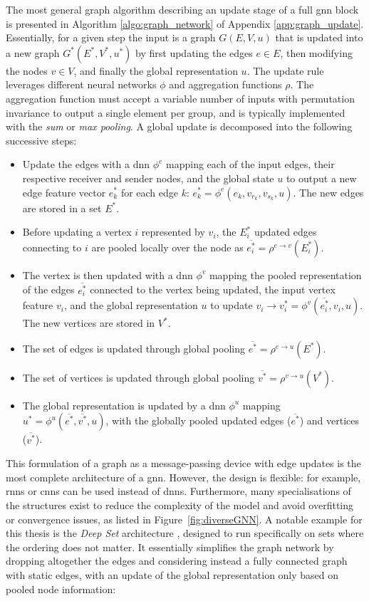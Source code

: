 The most general graph algorithm describing an update stage of a full \gls{gnn} block is presented in Algorithm \ref{algo:graph_network} of Appendix \ref{app:graph_update}. Essentially, for a given step the input is a graph $G(E, V, u)$ that is updated into a new graph $G^*(E^*, V^*, u^*)$ by first updating the edges $e \in E$, then modifying the nodes $v \in V$, and finally the global representation $u$. The update rule leverages different neural networks $\phi$ and aggregation functions $\rho$. The aggregation function must accept a variable number of inputs with permutation invariance to output a single element per group, and is typically implemented with the \textit{sum} or \textit{max pooling}. A global update is decomposed into the following successive steps: 
\begin{itemize}
    \item Update the edges with a \gls{dnn} $\phi^e$ mapping each of the input edges, their respective receiver and sender nodes, and the global state $u$ to output a new edge feature vector $e^*_k$ for each edge $k$: $e^*_k = \phi^e(e_k, v_{r_k}, v_{s_k}, u)$. The new edges are stored in a set $E^*$. 
    \item Before updating a vertex $i$ represented by $v_i$, the $E_i^*$ updated edges connecting to $i$ are pooled locally over the node as $\overline{e^*_i} = \rho^{e \rightarrow v}(E_i^*)$.
    \item The vertex is then updated with a \gls{dnn} $\phi^v$ mapping the pooled representation of the edges $\overline{e^*_i}$ connected to the vertex being updated, the input vertex feature $v_i$, and the global representation $u$ to update $v_i \rightarrow v^*_i = \phi^v(\overline{e^*_i}, v_i, u)$. The new vertices are stored in $V^*$.
    \item The set of edges is updated through global pooling $\overline{e^*} = \rho^{e \rightarrow u}(E^*)$.
    \item The set of vertices is updated through global pooling $\overline{v^*} = \rho^{v \rightarrow u}(V^*)$.
    \item The global representation is updated by a \gls{dnn} $\phi^u$ mapping $u^* = \phi^u(\overline{e^*}, \overline{v^*}, u)$, with the globally pooled updated edges ($\overline{e^*}$) and vertices ($\overline{v^*}$). 
\end{itemize} 
This formulation of a graph as a message-passing device with edge updates is the most complete architecture of a \gls{gnn}. However, the design is flexible: for example, \glspl{rnn} or \glspl{cnn} can be used instead of \glspl{dnn}. Furthermore, many specialisations of the structures exist to reduce the complexity of the model and avoid overfitting or convergence issues, as listed in Figure~\ref{fig:diverseGNN}. A notable example for this thesis is the \textit{Deep Set} architecture \cite{NIPS2017f22e4747}, designed to run specifically on sets where the ordering does not matter. It essentially simplifies the graph network by dropping altogether the edges and considering instead a fully connected graph with static edges, with an update of the global representation only based on pooled node information: 
